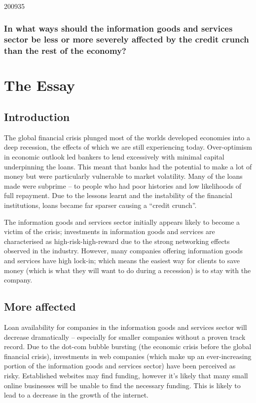 \documentclass[a4paper]{article}
\begin{document}
\begin{examquestion}{2009}{3}{5}

\subsubsection*{In what ways should the information goods and services
sector be less or more severely affected by the credit crunch than the rest
of the economy?}

\section*{The Essay}

\subsection*{Introduction}

The global financial crisis plunged most of the worlds developed economies
into a deep recession, the effects of which we are still experiencing today.
Over-optimism in economic outlook led bankers to lend excessively with
minimal capital underpinning the loans. This meant that banks had the
potential to make a lot of money but were particularly vulnerable to market
volatility. Many of the loans made were subprime -- to people who had
poor histories and low likelihoods of full repayment. Due to the lessons
learnt and the instability of the financial institutions, loans became far
sparser causing a ``credit crunch''.

The information goods and services sector initially appears likely to become a
victim of the crisis; investments in information goods and services are
characterised as high-risk-high-reward due to the strong networking effects
observed in the industry. However, many companies offering information goods
and services have high lock-in; which means the easiest way for clients to
save money (which is what they will want to do during a recession) is to
stay with the company.

\subsection*{More affected}

Loan availability for companies in the information goods and services sector
will decrease dramatically -- especially for smaller companies without a
proven track record. Due to the dot-com bubble bursting (the economic crisis
before the global financial crisis), investments in web companies (which
make up an ever-increasing portion of the information goods and services
sector) have been perceived as risky. Established websites may find funding,
however it's likely that many small online businesses will be unable to
find the necessary funding. This is likely to lead to a decrease in the
growth of the internet.


\end{examquestion}
\end{document}
